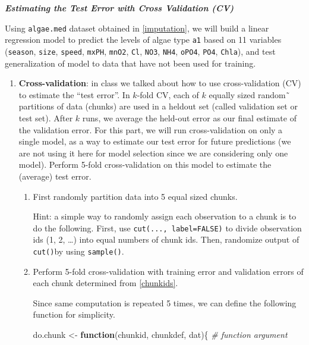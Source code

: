 \documentclass[]{article}
\newenvironment{Shaded}{\begin{snugshade}}{\end{snugshade}}
\newcommand{\StringTok}[1]{\textcolor[rgb]{0.31,0.60,0.02}{#1}}
\newcommand{\CommentTok}[1]{\textcolor[rgb]{0.56,0.35,0.01}{\textit{#1}}}
\newcommand{\ControlFlowTok}[1]{\textcolor[rgb]{0.13,0.29,0.53}{\textbf{#1}}}
\newcommand{\NormalTok}[1]{#1}
\begin{document}
\textbf{\emph{Estimating the Test Error with Cross Validation (CV)}}

Using \texttt{algae.med} dataset obtained in \eqref{imputation}, we will
build a linear regression model to predict the levels of algae type
\texttt{a1} based on 11 variables (\texttt{season}, \texttt{size},
\texttt{speed}, \texttt{mxPH}, \texttt{mnO2}, \texttt{Cl}, \texttt{NO3},
\texttt{NH4}, \texttt{oPO4}, \texttt{PO4}, \texttt{Chla}), and test
generalization of model to data that have not been used for training.

\begin{enumerate}
\def\labelenumi{\arabic{enumi}.}
\setcounter{enumi}{3}
\item
  \textbf{Cross-validation}: in class we talked about how to use
  cross-validation (CV) to estimate the ``test error''. In \(k\)-fold
  CV, each of \(k\) equally sized random˜ partitions of data (chunks)
  are used in a heldout set (called validation set or test set). After
  \(k\) runs, we average the held-out error as our final estimate of the
  validation error. For this part, we will run cross-validation on only
  a single model, as a way to estimate our test error for future
  predictions (we are not using it here for model selection since we are
  considering only one model). Perform 5-fold cross-validation on this
  model to estimate the (average) test error.

  \begin{enumerate}
  \item
    \label{chunkids} First randomly partition data into 5 equal sized
    chunks.

    Hint: a simple way to randomly assign each observation to a chunk is
    to do the following. First, use \texttt{cut(...,\ label=FALSE)} to
    divide observation ids (1, 2, \dots ) into equal numbers of chunk
    ids. Then, randomize output of \texttt{cut()}by using
    \texttt{sample()}.
  \item
    Perform 5-fold cross-validation with training error and validation
    errors of each chunk determined from \eqref{chunkids}.

    Since same computation is repeated 5 times, we can define the
    following function for simplicity.

\begin{Shaded}
\begin{Highlighting}[]
\NormalTok{do.chunk <-}\StringTok{ }\ControlFlowTok{function}\NormalTok{(chunkid, chunkdef, dat)\{  }\CommentTok{# function argument}


\end{Highlighting}
\end{Shaded}
\end{enumerate}
\end{enumerate}
\end{document}

